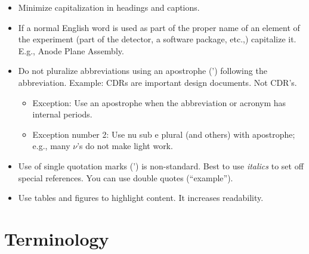 \begin{itemize}
\item Minimize capitalization in headings and captions.
\item If a normal English word is used as part of the proper name of an element of the experiment (part of the detector, a software package, etc.,) capitalize it. E.g., Anode Plane Assembly. 
\item Do not pluralize abbreviations using an apostrophe (') following the abbreviation. Example: CDRs are important design documents. Not CDR's. 
\begin{itemize}
\item Exception: Use an apostrophe when the abbreviation or acronym has internal periods. 
\item Exception number \num{2}: Use nu sub e plural (and others) with apostrophe; e.g., many $\nu$'s do not make light work.
\end{itemize}
\item Use of single quotation marks (') is non-standard. Best to use \emph{italics} to set off special references. You can use double quotes (``example''). 
\item Use tables and figures to highlight content. It increases readability. 
\end{itemize}



\section{Terminology}
\label{sec:english-terminology}

